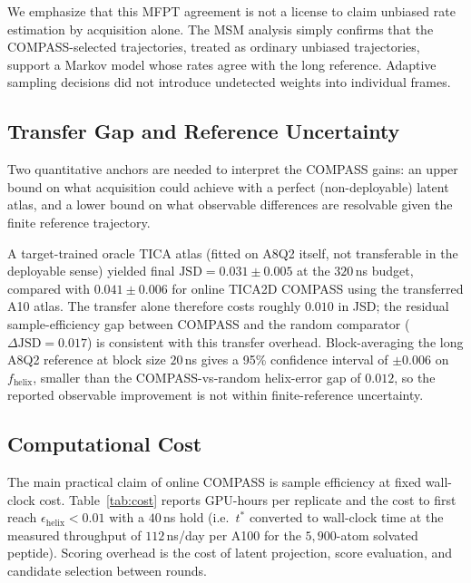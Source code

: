 \documentclass[journal=jctcce,manuscript=article,layout=twocolumn]{achemso}
\begin{document}
We emphasize that this MFPT agreement is not a license to claim unbiased rate estimation by acquisition alone. The MSM analysis simply confirms that the COMPASS-selected trajectories, treated as ordinary unbiased trajectories, support a Markov model whose rates agree with the long reference. Adaptive sampling decisions did not introduce undetected weights into individual frames.

\subsection{Transfer Gap and Reference Uncertainty}
\label{sec:results_transfer_gap}

Two quantitative anchors are needed to interpret the COMPASS gains: an upper bound on what acquisition could achieve with a perfect (non-deployable) latent atlas, and a lower bound on what observable differences are resolvable given the finite reference trajectory.

A target-trained oracle TICA atlas (fitted on A8Q2 itself, not transferable in the deployable sense) yielded final $\mathrm{JSD}=0.031\pm 0.005$ at the $320$\,ns budget, compared with $0.041\pm 0.006$ for online TICA2D COMPASS using the transferred A10 atlas. The transfer alone therefore costs roughly $0.010$ in JSD; the residual sample-efficiency gap between COMPASS and the random comparator ($\Delta\mathrm{JSD}=0.017$) is consistent with this transfer overhead. Block-averaging the long A8Q2 reference at block size $20$\,ns gives a 95\% confidence interval of $\pm 0.006$ on $f_{\mathrm{helix}}$, smaller than the COMPASS-vs-random helix-error gap of $0.012$, so the reported observable improvement is not within finite-reference uncertainty.

\subsection{Computational Cost}
\label{sec:results_cost}

The main practical claim of online COMPASS is sample efficiency at fixed wall-clock cost. Table~\ref{tab:cost} reports GPU-hours per replicate and the cost to first reach $\epsilon_{\mathrm{helix}}<0.01$ with a $40$\,ns hold (i.e.\ $t^*$ converted to wall-clock time at the measured throughput of $112$\,ns/day per A100 for the $5{,}900$-atom solvated peptide). Scoring overhead is the cost of latent projection, score evaluation, and candidate selection between rounds.
\end{document}
